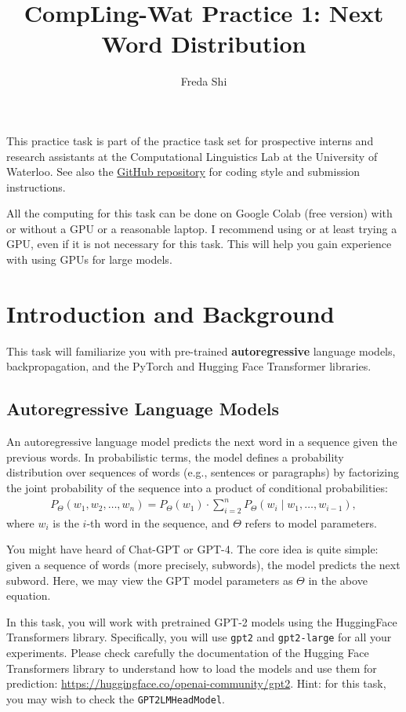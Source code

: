 \documentclass[12pt, letterpaper]{article}
\begin{document}
\title{CompLing-Wat Practice 1: Next Word Distribution}
\author{Freda Shi}
\maketitle

This practice task is part of the practice task set for prospective interns and research assistants at the Computational Linguistics Lab at the University of Waterloo.
See also the \href{https://github.com/compling-wat/ura-practice}{GitHub repository} for coding style and submission instructions.

All the computing for this task can be done on Google Colab (free version) with or without a GPU or a reasonable laptop.
I recommend using or at least trying a GPU, even if it is not necessary for this task.
This will help you gain experience with using GPUs for large models.

\section{Introduction and Background}
This task will familiarize you with pre-trained \textbf{autoregressive} language models, backpropagation, and the PyTorch and Hugging Face Transformer libraries.
\subsection{Autoregressive Language Models}
An autoregressive language model predicts the next word in a sequence given the previous words.
In probabilistic terms, the model defines a probability distribution over sequences of words (e.g., sentences or paragraphs) by factorizing the joint probability of the sequence into a product of conditional probabilities:
\begin{align*}
    P_\Theta(w_1, w_2, \ldots, w_n) = P_\Theta(w_1) \cdot \sum_{i=2}^n P_\Theta(w_i \mid w_1, \ldots, w_{i-1}),
\end{align*}
where $w_i$ is the $i$-th word in the sequence, and $\Theta$ refers to model parameters.

You might have heard of Chat-GPT or GPT-4.
The core idea is quite simple: given a sequence of words (more precisely, subwords), the model predicts the next subword.
Here, we may view the GPT model parameters as $\Theta$ in the above equation.

In this task, you will work with pretrained GPT-2 models using the HuggingFace Transformers library.
Specifically, you will use \texttt{gpt2} and \texttt{gpt2-large} for all your experiments.
Please check carefully the documentation of the Hugging Face Transformers library to understand how to load the models and use them for prediction: \url{https://huggingface.co/openai-community/gpt2}.
Hint: for this task, you may wish to check the \texttt{GPT2LMHeadModel}.
\end{document}
